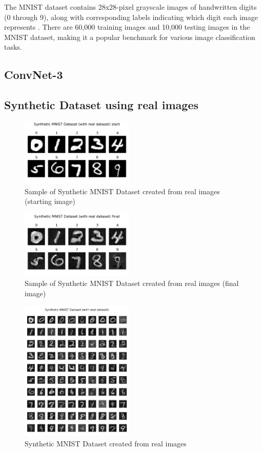 \documentclass[conference, compsoc]{IEEEtran}
\begin{document}
The MNIST dataset contains 28x28-pixel grayscale images of handwritten digits (0 through 9), along with corresponding labels indicating which digit each image represents \cite{deng2012mnist}. There are 60,000 training images and 10,000 testing images in the MNIST dataset, making it a popular benchmark for various image classification tasks.
\subsection{ConvNet-3}
\subsection{Synthetic Dataset using real images}
\begin{figure}[H]
	\centering
	\includegraphics[width=0.48\textwidth]{mnist_real_sample.png}
	\caption{Sample of Synthetic MNIST Dataset created from real images (starting image)}
	\label{fig:mnist_real_sample}
\end{figure}

\begin{figure}[H]
	\centering
	\includegraphics[width=0.48\textwidth]{mnist_real_syn.png}
	\caption{Sample of Synthetic MNIST Dataset created from real images (final image)}
	\label{fig:mnist_real_syn}
\end{figure}

\begin{figure}[H]
	\centering
	\includegraphics[width=0.48\textwidth]{mnist_real_syn_all.png}
	\caption{Synthetic MNIST Dataset created from real images}
	\label{fig:mnist_real_syn_all}
\end{figure}
\end{document}
